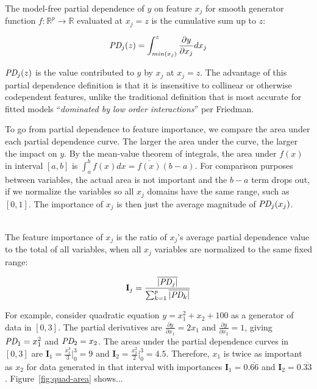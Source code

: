 \documentclass[twoside,11pt]{article}
\newcommand{\figref}[1]{Figure~\ref{#1}}
\newcommand{\Imp}{\mathbf{I}}
\begin{document}
~\\
 The model-free partial dependence of $y$ on feature $x_j$ for smooth generator function $f:\mathbb{R}^{p} \rightarrow \mathbb{R}$ evaluated at $x_j = z$ is the cumulative sum up to $z$:

\begin{equation}\label{eq:pd}
\text{\it PD}_j(z) = \int_{min(x_j)}^z \frac{\partial y}{\partial x_j} dx_j
\end{equation}

$\text{\it PD}_j(z)$ is the value contributed to $y$ by $x_j$ at $x_j = z$. The advantage of this partial dependence definition is that it is insensitive to collinear or otherwise codependent features, unlike the traditional definition that is most accurate for fitted models ``{\em dominated by low order interactions}'' per Friedman.  

To go from partial dependence to feature importance, we compare the area under each partial dependence curve. The larger the area under the curve, the larger the impact on $y$.   By the mean-value theorem of integrals, the area under $f(x)$ in interval $[a,b]$ is $\int_{a}^{b} f(x) dx = \overline{f(x)}(b-a)$.  For comparison purposes between variables, the actual area is not important and the $b-a$ term drops out, if we normalize the variables so all $x_j$ domains have the same range, such as $[0,1]$. The importance of $x_j$ is then just the average magnitude of $\text{\it PD}_j(x_j)$.

~\\
 The feature importance of $x_j$ is the ratio of $x_j$'s average partial dependence value to the total of all variables, when all $x_j$ variables are normalized to the same fixed range:

\begin{equation}\label{eq:Epd2a}
\Imp_j = \frac{\overline{|\text{\it PD}_j|}}{\sum_{k=1}^p \overline{|\text{\it PD}_k|}}
\end{equation}

\noindent For example, consider quadratic equation $y = x_1^2 + x_2 + 100$ as a generator of data in $[0,3]$. The partial derivatives are $\frac{\partial y}{\partial x_1} = 2 x_1$ and $\frac{\partial y}{\partial x_2} = 1$, giving $\text{\it PD}_1 = x_1^2$ and $\text{\it PD}_2 = x_2$. The areas under the partial dependence curves in $[0,3]$ are $\Imp_1 = \frac{x_1^3}{3} \big |_0^3 = 9$ and $\Imp_2 = \frac{x_2^2}{2} \big |_0^3 = 4.5$.   Therefore, $x_1$ is twice as important as $x_2$ for data generated in that interval with importances $\Imp_1 = 0.\overline{66}$ and $\Imp_2 = 0.\overline{33}$. \figref{fig:quad-area} shows...
\end{document}
